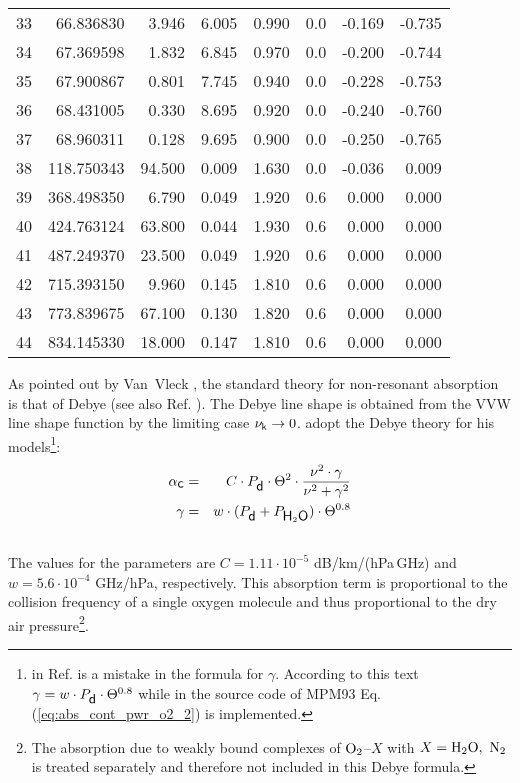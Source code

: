 {\begin{longtable}{|l||r|r|r|r|r|r|r|}
33 & 66.836830 &   3.946 &  6.005 &    0.990 & 0.0 &  -0.169 &   -0.735\\
34 & 67.369598 &   1.832 &  6.845 &    0.970 & 0.0 &  -0.200 &   -0.744\\
35 & 67.900867 &   0.801 &  7.745 &    0.940 & 0.0 &  -0.228 &   -0.753\\
36 & 68.431005 &   0.330 &  8.695 &    0.920 & 0.0 &  -0.240 &   -0.760\\
37 & 68.960311 &   0.128 &  9.695 &    0.900 & 0.0 &  -0.250 &   -0.765\\
38 & 118.750343 &  94.500 &  0.009 &   1.630 & 0.0 &  -0.036 &    0.009\\
39 & 368.498350 &   6.790 &  0.049 &   1.920 & 0.6 &   0.000 &    0.000\\
40 & 424.763124 &  63.800 &  0.044 &   1.930 & 0.6 &   0.000 &    0.000\\
41 & 487.249370 &  23.500 &  0.049 &   1.920 & 0.6 &   0.000 &    0.000\\
42 & 715.393150 &   9.960 &  0.145 &   1.810 & 0.6 &   0.000 &    0.000\\
43 & 773.839675 &  67.100 &  0.130 &   1.820 & 0.6 &   0.000 &    0.000\\
44 & 834.145330 &  18.000 &  0.147 &   1.810 & 0.6 &   0.000 &    0.000\\
\hline
\end{longtable}


\label{levele:mpm93_o2cont}
As pointed out by Van~Vleck \cite{vv:87}, the standard theory for
non-resonant absorption is that of Debye (see also Ref. \cite{townes:55}). 
The Debye line shape is obtained from the VVW line shape function 
by the limiting case $\nu_{\sf k} \rightarrow 0$.
\cite{liebeetal:93} adopt the Debye theory for his models\footnote{in 
  Ref. \cite{liebeetal:93} is a mistake in the formula
  for $\gamma$. According to this text $\gamma =
  w\cdot P_{\mbox{\sf d}}\cdot\Theta^{0.8}$ while in the source code of MPM93 
  Eq. (\ref{eq:abs_cont_pwr_o2_2}) is implemented.}: 
\begin{eqnarray}
  \label{eq:mpm93_o2cont}
  \alphac &=&  C \cdot \pda \cdot \Theta^2 \cdot 
               \frac{\nu^2 \cdot \gamma}{\nu^2+\gamma^2}\\
%
  \gamma  &=&  w \cdot (\pda + \phzo) \cdot \Theta^{0.8}\nonumber\\
\nonumber
\end{eqnarray}
The values for the parameters are $C = 1.11\cdot 10^{-5}$ dB/km/(hPa\,GHz) and 
$w = 5.6 \cdot 10^{-4}$ GHz/hPa, respectively. This absorption
term is proportional to the collision frequency of a single oxygen molecule
and thus proportional to the dry air pressure\footnote{The absorption
  due to weakly bound complexes of $\mbox{O}_2$--$X$ with $X=\mbox{H}_2\mbox{O},~\mbox{N}_2$ is 
  treated separately and therefore not included in this Debye
  formula.}.



}
